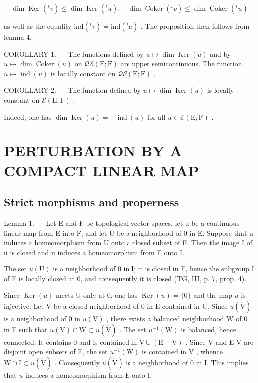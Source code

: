 \[
\dim \operatorname{Ker} (^ {t} v) \leqslant \dim \operatorname{Ker} (^ {t} u), \quad \dim \operatorname{Coker} (^ {t} v) \leqslant \dim \operatorname{Coker} (^ {t} u)
\]

as well as the equality \(\mathrm{ind}(^{t}v)=\mathrm{ind}(^{t}u)\) . The proposition then follows from lemma 4.

COROLLARY 1. --- The functions defined by \(u \mapsto \dim \operatorname{Ker}(u)\) and by \(u \mapsto \dim \operatorname{Coker}(u)\) on \(\mathcal{Q}\mathcal{E}(\mathrm{E};\mathrm{F})\) are upper semicontinuous. The function \(u \mapsto \operatorname{ind}(u)\) is locally constant on \(\mathcal{Q}\mathcal{E}(\mathrm{E};\mathrm{F})\) .

COROLLARY 2. --- The function defined by \(u \mapsto \dim \operatorname{Ker}(u)\) is locally constant on \(\mathcal{E}(\mathrm{E};\mathrm{F})\) .

Indeed, one has \(\dim \operatorname{Ker}(u) = -\operatorname{ind}(u)\) for all \(u \in \mathcal{E}(\mathrm{E};\mathrm{F})\) .

\section{PERTURBATION BY A COMPACT LINEAR MAP}

\subsection{Strict morphisms and properness}

Lemma 1. --- Let E and F be topological vector spaces, let u be a continuous linear map from E into F, and let U be a neighborhood of 0 in E. Suppose that u induces a homeomorphism from U onto a closed subset of F. Then the image I of u is closed and u induces a homeomorphism from E onto I.

The set \(u(\mathrm{U})\) is a neighborhood of 0 in I; it is closed in F, hence the subgroup I of F is locally closed at 0, and consequently it is closed (TG, III, p. 7, prop. 4).

Since \(\operatorname{Ker}(u)\) meets U only at 0, one has \(\operatorname{Ker}(u) = \{0\}\) and the map \(u\) is injective. Let V be a closed neighborhood of 0 in E contained in U. Since \(u(\mathring{\mathrm{V}})\) is a neighborhood of 0 in \(u(\mathrm{V})\) , there exists a balanced neighborhood W of 0 in F such that \(u(\mathrm{V}) \cap \mathrm{W} \subset u(\mathring{\mathrm{V}})\) . The set \(u^{-1}(\mathrm{W})\) is balanced, hence connected. It contains 0 and is contained in \(\mathring{\mathrm{V}} \cup (\mathrm{E} - \mathrm{V})\) . Since \(\mathring{\mathrm{V}}\) and E-V are disjoint open subsets of E, the set \(u^{-1}(\mathrm{W})\) is contained in \(\mathring{\mathrm{V}}\) , whence \(\mathrm{W} \cap \mathrm{I} \subset u(\mathring{\mathrm{V}})\) . Consequently \(u(\mathring{\mathrm{V}})\) is a neighborhood of 0 in I. This implies that \(u\) induces a homeomorphism from E onto I.


